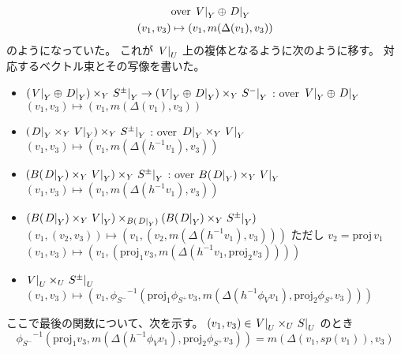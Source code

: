 \begin{Proof}
\begin{align*}
    & \text{over} \, \left. {V} \right| _{Y} \oplus \left. {D} \right| _{Y} \\
    (v_1 , v_3) & \mapsto (v_1, m(\Delta(v_1), v_3))
  \end{align*}
  のようになっていた。
  これが \(\left. {V} \right| _{U}\) 上の複体となるように次のように移す。
  対応するベクトル束とその写像を書いた。
  \begin{itemize}
    \item \((\left. {V} \right| _{Y} \oplus \left. {D} \right| _{Y}) \times_{Y} \left. {S^{\pm}} \right| _{Y} \to (\left. {V} \right| _{Y} \oplus \left. {D} \right| _{Y}) \times_{Y} \left. {S^{-}} \right| _{Y}\) : over \(\left. {V} \right| _{Y} \oplus \left. {D} \right| _{Y}\) \\
    \((v_1, v_3) \mapsto (v_1, m(\Delta(v_1), v_3))\)
    \item \((\left. {D} \right| _{Y} \times_{Y} \left. {V} \right| _{Y}) \times_{Y} \left. {S^{\pm}} \right| _{Y}\) : over \(\left. {D} \right| _{Y} \times_{Y} \left. {V} \right| _{Y}\) \\
    \((v_1, v_3) \mapsto (v_1, m(\Delta(h^{-1} v_1), v_3))\)
    \item \((B(\left. {D} \right| _{Y}) \times_{Y} \left. {V} \right| _{Y}) \times_{Y} \left. {S^{\pm}} \right| _{Y}\) : over \(B(\left. {D} \right| _{Y}) \times_{Y} \left. {V} \right| _{Y}\) \\
    \((v_1, v_3) \mapsto (v_1, m(\Delta(h^{-1} v_1), v_3))\)
    \item \((B(\left. {D} \right| _{Y}) \times_{Y} \left. {V} \right| _{Y}) \times_{B(\left. {D} \right| _{Y})} (B(\left. {D} \right| _{Y}) \times_{Y} \left. {S^{\pm}} \right| _{Y})\) \\
    \((v_1, (v_2, v_3)) \mapsto (v_1, (v_2, m(\Delta(h^{-1} v_1), v_3)))\) ただし \(v_2 = \text{proj}\,v_1\) \\
    \((v_1, v_3) \mapsto (v_1, (\text{proj}_1 v_3, m(\Delta(h^{-1} v_1, \text{proj}_2 v_3))))\)
    \item \(\left. {V} \right| _{U} \times_{U} \left. {S^{\pm}} \right| _{U}\) \\
    \((v_1, v_3) \mapsto (v_1, {\phi_{S^{-}}}^{-1} (\text{proj}_1 \phi_{S^{+}} v_3, m(\Delta(h^{-1} \phi_{V} v_1), \text{proj}_2 \phi_{S^{+}} v_3)))\)
  \end{itemize}
  ここで最後の関数について、次を示す。
  \((v_1, v_3) \in \left. {V} \right| _{U} \times_{U} \left. {S} \right| _{U}\) のとき
  \[{\phi_{S^{-}}}^{-1} (\text{proj}_1 v_3, m(\Delta(h^{-1} \phi_{V} v_1), \text{proj}_2 \phi_{S^{+}} v_3)) = m(\Delta(v_1, sp(v_1)), v_3)\]
\end{Proof}

